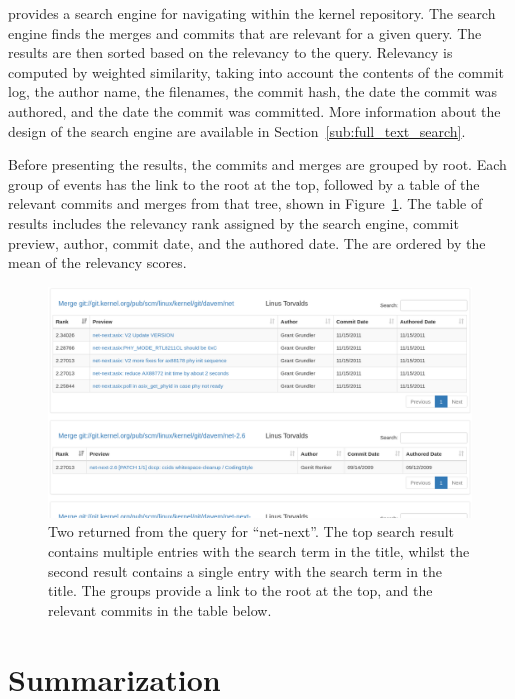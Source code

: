 \tool{} provides a search engine for navigating within the kernel
repository.
The search engine finds the merges and commits that are relevant for a
given query.
The results are then sorted based on the relevancy to the query.
Relevancy is computed by weighted similarity, taking into account the
contents of the commit log,
the author name, the filenames, the commit hash, the date the commit was
authored, and the date the commit was committed.
More information about the design of the search engine are available in
Section~\ref{sub:full_text_search}.

Before presenting the results, the commits and merges are grouped by
\mt{} root. Each group of events has the link to the root at the
top, followed by a table of the relevant commits and merges from that
tree, shown in Figure~\ref{fig:linvis_search_results}. The table of
results includes the relevancy rank assigned by the search engine,
commit preview, author, commit date, and the authored date. The
 are ordered by the mean of the relevancy scores.

\begin{figure}[htpb]
  \centering
  \includegraphics[width=0.98\linewidth]{Figures/Linvis/search_results.png}
  \caption{Two  returned from the query for ``net-next''. The top
    search result contains multiple entries with the search term in the
    title, whilst the second result contains a single entry with the
    search term in the title. The groups provide a link to the root at
    the top, and the relevant commits in the table below.}
  \label{fig:linvis_search_results}
\end{figure}

\section{Summarization}\label{sec:summarization}

